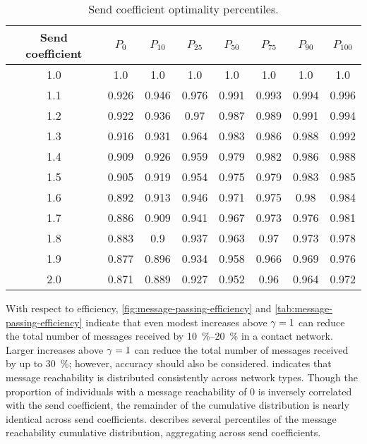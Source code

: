 \begin{table}[htbp]
\centering
\begin{tabular}{
  S
  S[table-auto-round, table-format = 1.3]
  S[table-auto-round, table-format = 1.3]
  S[table-auto-round, table-format = 1.3]
  S[table-auto-round, table-format = 1.3]
  S[table-auto-round, table-format = 1.3]
  S[table-auto-round, table-format = 1.3]
  S[table-auto-round, table-format = 1.3]
}
  \toprule
  {Send coefficient} & {$P_{0}$} & {$P_{10}$} & {$P_{25}$} & {$P_{50}$} & {$P_{75}$} & {$P_{90}$} & {$P_{100}$} \\
   & 1.0 & 1.0 & 1.0 & 1.0 & 1.0 & 1.0 & 1.0 \\ 
  1.1 & 0.926 & 0.946 & 0.976 & 0.991 & 0.993 & 0.994 & 0.996 \\ 
  1.2 & 0.922 & 0.936 & 0.97 & 0.987 & 0.989 & 0.991 & 0.994 \\ 
  1.3 & 0.916 & 0.931 & 0.964 & 0.983 & 0.986 & 0.988 & 0.992 \\ 
  1.4 & 0.909 & 0.926 & 0.959 & 0.979 & 0.982 & 0.986 & 0.988 \\ 
  1.5 & 0.905 & 0.919 & 0.954 & 0.975 & 0.979 & 0.983 & 0.985 \\ 
  1.6 & 0.892 & 0.913 & 0.946 & 0.971 & 0.975 & 0.98 & 0.984 \\ 
  1.7 & 0.886 & 0.909 & 0.941 & 0.967 & 0.973 & 0.976 & 0.981 \\ 
  1.8 & 0.883 & 0.9 & 0.937 & 0.963 & 0.97 & 0.973 & 0.978 \\ 
  1.9 & 0.877 & 0.896 & 0.934 & 0.958 & 0.966 & 0.969 & 0.976 \\ 
  2.0 & 0.871 & 0.889 & 0.927 & 0.952 & 0.96 & 0.964 & 0.972 \\ 
  \bottomrule
\end{tabular}
\caption[Send coefficient optimality percentiles]{Send coefficient optimality percentiles.}
\label{tab:send-coefficient-optimality}
\end{table}

With respect to efficiency, \cref{fig:message-passing-efficiency} and \cref{tab:message-passing-efficiency} indicate that even modest increases above $\gamma = 1$ can reduce the total number of messages received by \qtyrange{10}{20}{\percent} in a contact network. Larger increases above $\gamma = 1$ can reduce the total number of messages received by up to \qty{30}{\percent}; however, accuracy should also be considered.  indicates that message reachability is distributed consistently across network types. Though the proportion of individuals with a message reachability of 0 is inversely correlated with the send coefficient, the remainder of the cumulative distribution is nearly identical across send coefficients.  describes several percentiles of the message reachability cumulative distribution, aggregating across send coefficients.


